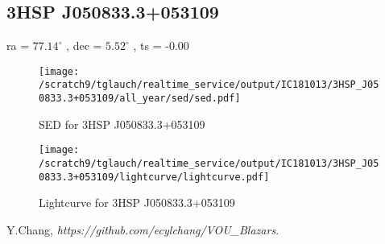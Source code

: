 \documentclass[a4paper]{article}
\begin{document}
\subsection{3HSP J050833.3+053109}              ra = $77.14^\circ$ , dec = $5.52^\circ$ , ts = -0.00\begin{figure}[h!]
\centering
  \texttt{[image: /scratch9/tglauch/realtime\_service/output/IC181013/3HSP\_J050833.3+053109/all\_year/sed/sed.pdf]}
  \caption{SED for 3HSP J050833.3+053109}
\end{figure}
\begin{figure}[h!]
\centering
  \texttt{[image: /scratch9/tglauch/realtime\_service/output/IC181013/3HSP\_J050833.3+053109/lightcurve/lightcurve.pdf]}
  \caption{Lightcurve for 3HSP J050833.3+053109}
\end{figure}
\clearpage 



\begin{thebibliography}{9}
  Y.Chang,
  \emph{https://github.com/ecylchang/VOU\_Blazars}.
\end{thebibliography}
\end{document}
